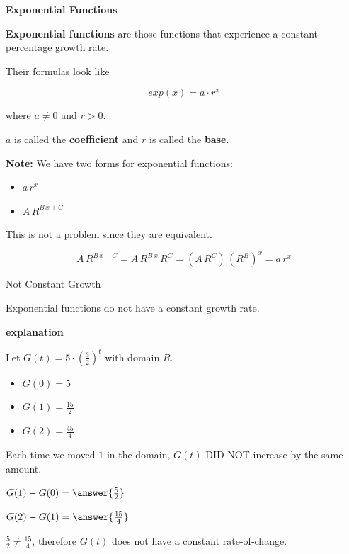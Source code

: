 \documentclass{ximera}
\begin{document}
\begin{idea} \textbf{\textcolor{blue!55!black}{Exponential Functions}}


\textbf{Exponential functions} are those functions that experience a constant percentage growth rate. 


Their formulas look like

\[
exp(x) = a \cdot r^x
\]


where $a \ne 0$ and $r > 0$.

$a$ is called the \textbf{coefficient} and $r$ is called the \textbf{base}.

\end{idea}



\textbf{Note:}  We have two forms for exponential functions:

\begin{itemize}
\item $a \, r^x$
\item $A \, R^{B\,x+C}$
\end{itemize}

This is not a problem since they are equivalent.


\[
A \, R^{B\,x+C} = A \, R^{B\,x} \, R^C = (A \, R^C)\, (R^B)^x = a \, r^x
\]











\begin{fact}  Not Constant Growth



Exponential functions do not have a constant growth rate. 

\textbf{\textcolor{red!75!green}{explanation}} 

Let $G(t) = 5 \cdot \left(\frac{3}{2}\right)^t$ with domain \textbf{$R$}. 






\begin{itemize}
\item $G(0) = 5$
\item $G(1) = \frac{15}{2}$
\item $G(2) = \frac{45}{4}$
\end{itemize}



Each time we moved $1$ in the domain, $G(t)$ DID NOT increase by the same amount.

$G(1) - G(0) = \answer{\frac{5}{2}}$ 

$G(2) - G(1) = \answer{\frac{15}{4}}$ 

$ \frac{5}{2}  \ne  \frac{15}{4} $, therefore $G(t)$ does not have a constant rate-of-change. 




\end{fact}
\end{document}
